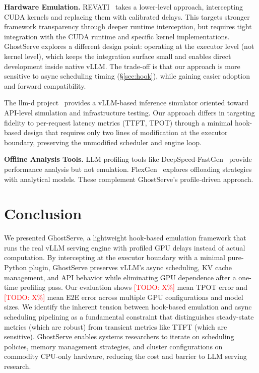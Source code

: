 \documentclass[conference]{IEEEtran}
\newcommand{\sysname}{GhostServe}
\newcommand{\todo}[1]{\textcolor{red}{[TODO: #1]}}
\begin{document}
\textbf{Hardware Emulation.} REVATI~\cite{agrawal2024revati} takes a lower-level approach, intercepting CUDA kernels and replacing them with calibrated delays. This targets stronger framework transparency through deeper runtime interception, but requires tight integration with the CUDA runtime and specific kernel implementations. \sysname{} explores a different design point: operating at the executor level (not kernel level), which keeps the integration surface small and enables direct development inside native vLLM. The trade-off is that our approach is more sensitive to async scheduling timing (\S\ref{sec:hook}), while gaining easier adoption and forward compatibility.

The llm-d project~\cite{llmd2024sim} provides a vLLM-based inference simulator oriented toward API-level simulation and infrastructure testing. Our approach differs in targeting fidelity to per-request latency metrics (TTFT, TPOT) through a minimal hook-based design that requires only two lines of modification at the executor boundary, preserving the unmodified scheduler and engine loop.

\textbf{Offline Analysis Tools.} LLM profiling tools like DeepSpeed-FastGen~\cite{holmes2024deepspeed} provide performance analysis but not emulation. FlexGen~\cite{sheng2023flexgen} explores offloading strategies with analytical models. These complement \sysname{}'s profile-driven approach.

\section{Conclusion}

We presented \sysname{}, a lightweight hook-based emulation framework that runs the real vLLM serving engine with profiled GPU delays instead of actual computation. By intercepting at the executor boundary with a minimal pure-Python plugin, \sysname{} preserves vLLM's async scheduling, KV cache management, and API behavior while eliminating GPU dependence after a one-time profiling pass. Our evaluation shows \todo{X\%} mean TPOT error and \todo{X\%} mean E2E error across multiple GPU configurations and model sizes. We identify the inherent tension between hook-based emulation and async scheduling pipelining as a fundamental constraint that distinguishes steady-state metrics (which are robust) from transient metrics like TTFT (which are sensitive). \sysname{} enables systems researchers to iterate on scheduling policies, memory management strategies, and cluster configurations on commodity CPU-only hardware, reducing the cost and barrier to LLM serving research.




\end{document}
